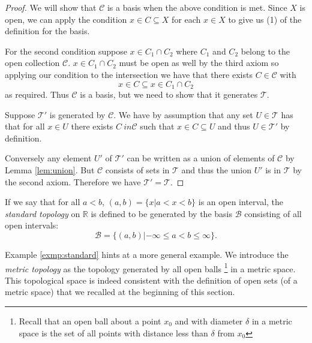 \begin{proof}
  We will show that $\mathscr{C}$ is a basis when the above condition
  is met. Since $X$ is open, we can apply the condition $x \in C
  \subseteq X$ for each $x \in X$ to give us (1) of the definition for
  the basis.

  For the second condition suppose $x \in C_1 \cap C_2$ where $C_1$
  and $C_2$ belong to the open collection $\mathscr{C}$. $x \in C_1
  \cap C_2$ must be open as well by the third axiom so applying our
  condition to the intersection we have that there exists $C \in
  \mathscr{C}$ with
  \[
    x \in C \subseteq x \in C_1 \cap C_2
  \]
  as required. Thus $\mathscr{C}$ is a basis, but we need to show that
  it generates $\mathscr{T}$.

  Suppose $\mathscr{T}'$ is generated by $\mathscr{C}$. We have by
  assumption that any set $U \in \mathscr{T}$ has that for all $x \in
  U$ there exists $C\ in \mathscr{C}$ such that $x \in C \subseteq U$
  and thus $U \in \mathscr{T}'$ by definition.

  Conversely any element $U'$ of $\mathscr{T}'$ can be written as a
  union of elements of $\mathscr{C}$ by Lemma \ref{lem:union}. But
  $\mathscr{C}$ consists of sets in $\mathscr{T}$ and thus the union
  $U'$ is in $\mathscr{T}$ by the second axiom. Therefore we have
  $\mathscr{T}' = \mathscr{T}$.
\end{proof}

\begin{exmp}
  \label{exmp:standard}
  If we say that for all $a<b$, $(a,b) = \{x | a < x <b \}$ is an open
  interval, the \emph{standard topology} on $\mathbb{R}$ is defined to be
  generated by the basis $\mathscr{B}$ consisting of all open
  intervals:
  \[
    \mathscr{B} = \{(a,b)| -\infty \leq a < b \leq \infty\}.
  \]
\end{exmp}

\begin{exmp}
  \label{exmp:metric}
  Example \ref{exmp:standard} hints at a more general example. We
  introduce the \emph{metric topology} as the topology generated by all
  open balls \footnote{Recall that an open ball about a point $x_0$
    and with diameter $\delta$ in a metric space is the set of all
    points with distance less than $\delta$ from $x_0$} in a metric
  space. This topological space is indeed consistent with the
  definition of open sets (of a metric space) that we recalled at the
  beginning of this section.
\end{exmp}

